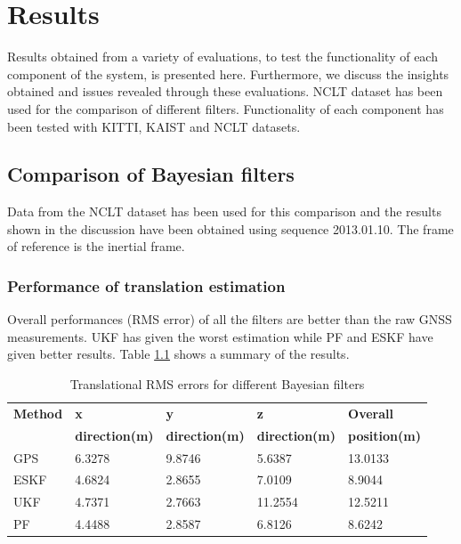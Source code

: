 \chapter{Results}
\label{chapter:results}
Results obtained from a variety of evaluations, to test the functionality of each component of the system, is presented here. Furthermore, we discuss the insights obtained and issues revealed through these evaluations. \gls{NCLT} dataset has been used for the comparison of different filters. Functionality of each component has been tested with \gls{KITTI}, \gls{KAIST} and \gls{NCLT} datasets.



\section{Comparison of Bayesian filters}
\label{sec:BayesianFilterComparison}
Data from the \gls{NCLT} dataset has been used for this comparison and the results shown in the discussion have been obtained using sequence 2013.01.10. The frame of reference is the inertial frame.
\subsection{Performance of translation estimation}
Overall performances (\gls{RMS} error) of all the filters are better than the raw \gls{GNSS} measurements. \gls{UKF} has given the worst estimation while \gls{PF} and \gls{ESKF} have given better results. Table \ref{table:ch:RMSErrorPosition} shows a summary of the results.
\begin{table}[h]
    \centering
    \begin{tabular}{|p{2.5cm}|p{2.5cm}|p{2.5cm}|p{2.5cm}|p{2.5cm}|} 
        \hline
        \textbf{Method} & \textbf{x} & \textbf{y} & \textbf{z}& \textbf{Overall} \\
        \textbf{} & \textbf{direction(m)} & \textbf{direction(m)} & \textbf{direction(m)}& \textbf{position(m)} \\
        \hline
        GPS&6.3278 &9.8746 &5.6387& 13.0133\\
        \hline
        ESKF &4.6824& 2.8655 &7.0109 &8.9044\\
        \hline
        UKF &4.7371& 2.7663 &11.2554 &12.5211
        \\
        \hline
        PF& 4.4488& 2.8587& 6.8126& 8.6242
        \\
        \hline
    \end{tabular}
\caption{Translational \gls{RMS} errors for different Bayesian filters}
\label{table:ch:RMSErrorPosition}
\end{table}

